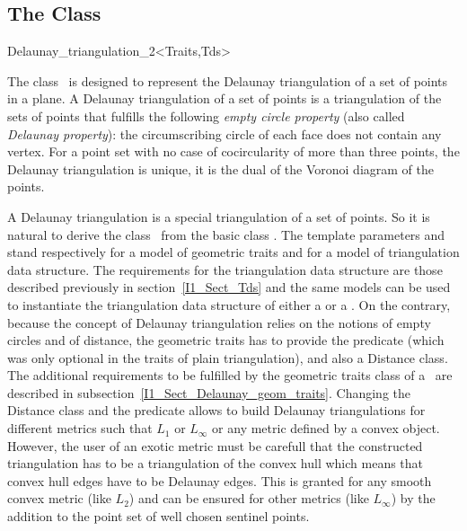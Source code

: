 \subsection{The Class \protect {}}
\begin{ccClassTemplate} {Delaunay_triangulation_2<Traits,Tds>}
\ccDefinition

The class \ccClassTemplateName\ is designed to represent
the Delaunay triangulation of a set of points in a plane.
A  Delaunay triangulation of a set of points
is a triangulation of the sets of points that fulfills
the following {\em empty circle property} 
(also called {\em Delaunay property}): the circumscribing
circle of each
 face does not contain any vertex.
For a point set with no case of cocircularity 
of more than three points,
the Delaunay triangulation is unique, it is  the dual
of the Voronoi diagram of the points.


A Delaunay triangulation is a special triangulation of a set of points.
So it is natural to derive  the class \ccClassTemplateName\
from the basic class .
The template parameters  and  stand 
respectively
for a model of geometric traits and for a model of triangulation data structure.
The requirements for the triangulation data structure
are those described previously in section~\ref{I1_Sect_Tds}
and the same models can be used to instantiate the
triangulation data structure of either a 
or a \ccClassTemplateName. On the contrary, because the
concept of Delaunay triangulation relies on the notions of 
empty circles and of distance, 
the geometric traits has to provide
the  predicate
(which was only optional in the traits of plain triangulation),
and also
a Distance class. The additional requirements
to be fulfilled by the geometric traits class
of a \ccClassTemplateName\ are described in 
subsection~\ref{I1_Sect_Delaunay_geom_traits}. 
Changing the Distance class and the  predicate 
allows to build Delaunay triangulations for different metrics
such that $L_1$ or $L_{\infty}$ or any metric defined by a
convex object. However, the user of an exotic metric
must be carefull that the constructed triangulation 
has to be a triangulation of the convex hull
which means that convex hull edges have to be Delaunay edges.
This is granted for any smooth convex metric (like $L_2$)
and can be ensured for other metrics (like  $L_{\infty}$)
by the addition to the point set of well chosen sentinel points.




\end{ccClassTemplate}
